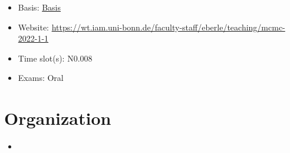 \begin{tcolorbox}[enhanced,breakable,
	title=General Information,frame style={color=mycolor}]
    \begin{itemize}
        \item Basis: \href{https://basis.uni-bonn.de/qisserver/rds?state=verpublish&status=init&vmfile=no&publishid=253504&moduleCall=webInfo&publishConfFile=webInfo&publishSubDir=veranstaltung}{Basis}
        \item Website: \href{https://wt.iam.uni-bonn.de/faculty-staff/eberle/teaching/mcmc-2022-1-1}{https://wt.iam.uni-bonn.de/faculty-staff/eberle/teaching/mcmc-2022-1-1}
        \item Time slot(s):  N0.008
        \item Exams: Oral
    \end{itemize}
\end{tcolorbox}

\section{Organization}

\begin{itemize}
    \item
\end{itemize}

